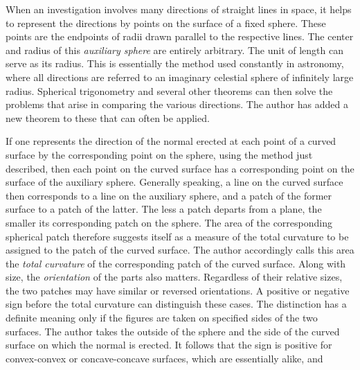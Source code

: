 %
\par\indent When an investigation involves many directions of straight lines in space, it helps to represent the directions by points on the surface of a fixed sphere. These points are the endpoints of radii drawn parallel to the respective lines. The center and radius of this \textit{auxiliary sphere} are entirely arbitrary. The unit of length can serve as its radius. This is essentially the method used constantly in astronomy, where all directions are referred to an imaginary celestial sphere of infinitely large radius. Spherical trigonometry and several other theorems can then solve the problems that arise in comparing the various directions. The author has added a new theorem to these that can often be applied.

If one represents the direction of the normal erected at each point of a curved surface by the corresponding point on the sphere, using the method just described, then each point on the curved surface has a corresponding point on the surface of the auxiliary sphere. Generally speaking, a line on the curved surface then corresponds to a line on the auxiliary sphere, and a patch of the former surface to a patch of the latter. The less a patch departs from a plane, the smaller its corresponding patch on the sphere. The area of the corresponding spherical patch therefore suggests itself as a measure of the total curvature to be assigned to the patch of the curved surface. The author accordingly calls this area the \textit{total curvature} of the corresponding patch of the curved surface. Along with size, the \textit{orientation} of the parts also matters. Regardless of their relative sizes, the two patches may have similar or reversed orientations. A positive or negative sign before the total curvature can distinguish these cases. The distinction has a definite meaning only if the figures are taken on specified sides of the two surfaces. The author takes the outside of the sphere and the side of the curved surface on which the normal is erected. It follows that the sign is positive for convex-convex or concave-concave surfaces, which are essentially alike, and %
